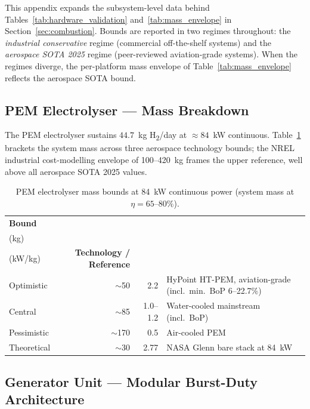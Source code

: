 \documentclass[applsci,article,submit,pdftex,moreauthors]{Definitions/mdpi}
\begin{document}
This appendix expands the subsystem-level data behind Tables~\ref{tab:hardware_validation} and~\ref{tab:mass_envelope} in Section~\ref{sec:combustion}. Bounds are reported in two regimes throughout: the \emph{industrial conservative} regime (commercial off-the-shelf systems) and the \emph{aerospace SOTA 2025} regime (peer-reviewed aviation-grade systems). When the regimes diverge, the per-platform mass envelope of Table~\ref{tab:mass_envelope} reflects the aerospace SOTA bound.

\subsection{PEM Electrolyser --- Mass Breakdown}
\label{app:pem_bounds}

The PEM electrolyser sustains $44.7$~kg H\textsubscript{2}/day at ${\approx}84$~kW continuous. Table~\ref{tab:pem_bounds} brackets the system mass across three aerospace technology bounds; the NREL industrial cost-modelling envelope of 100--420~kg frames the upper reference, well above all aerospace SOTA 2025 values.

\begin{table}[H]
\centering
\footnotesize
\caption{PEM electrolyser mass bounds at 84~kW continuous power (system mass at $\eta = 65$--$80\%$).}
\label{tab:pem_bounds}
\renewcommand{\arraystretch}{1.15}
\begin{tabular}{@{} l r r p{5cm} @{}}
\toprule
\textbf{Bound} & \makecell{\textbf{Mass}\\(kg)} & \makecell{\textbf{Power density}\\(kW/kg)} & \textbf{Technology / Reference} \\
\midrule
Optimistic  & $\sim$50  & 2.2       & HyPoint HT-PEM, aviation-grade (incl.\ min.\ BoP 6--22.7\%) \cite{Zhang2025PEMFC,Dotzauer2026AMBER} \\
Central     & $\sim$85  & 1.0--1.2  & Water-cooled mainstream (incl.\ BoP) \cite{Zhang2025PEMFC,Xue2025PEMAviation} \\
Pessimistic & $\sim$170 & 0.5       & Air-cooled PEM \cite{Zhang2025PEMFC} \\
Theoretical & $\sim$30  & 2.77      & NASA Glenn bare stack at 84~kW \cite{Burke2003NASA} \\
\bottomrule
\end{tabular}
\end{table}

\subsection{Generator Unit --- Modular Burst-Duty Architecture}
\label{app:generator_bounds}
\end{document}
